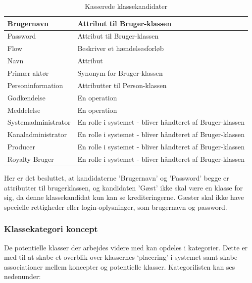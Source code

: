 \begin{table}[H]
\begin{tabularx}{\textwidth}{|X|X|}
        \hline
        Brugernavn & Attribut til Bruger-klassen\\
        \hline
        Password & Attribut til Bruger-klassen\\
        \hline
        Flow & Beskriver et hændelsesforløb\\
        \hline
        Navn & Attribut \\
        \hline
        Primær aktør &  Synonym for Bruger-klassen\\
        \hline
        Personinformation &  Attributter til Person-klassen\\
        \hline
        Godkendelse & En operation \\
        \hline
        Meddelelse & En operation \\
        \hline
        Systemadministrator & En rolle i systemet - bliver håndteret af Bruger-klassen \\
        \hline
        Kanaladministrator & En rolle i systemet - bliver håndteret af Bruger-klassen \\
        \hline 
        Producer & En rolle i systemet - bliver håndteret af Bruger-klassen \\
        \hline
        Royalty Bruger & En rolle i systemet - bliver håndteret af Bruger-klassen \\
        \hline
    \end{tabularx}
    \caption{Kasserede klassekandidater}
    \label{table:deleted_class_candidates}
\end{table}

\noindent
Her er det besluttet, at kandidaterne 'Brugernavn' og 'Password' begge er attributter til brugerklassen, og kandidaten 'Gæst' ikke skal være en klasse for sig, da denne klassekandidat kun kan se krediteringerne. Gæster skal ikke have specielle rettigheder eller login-oplysninger, som brugernavn og password.


\subsubsection{Klassekategori koncept}
De potentielle klasser der arbejdes videre med kan opdeles i kategorier. Dette er med til at skabe et overblik over klassernes ‘placering’ i systemet samt skabe associationer mellem koncepter og potentielle klasser.
Kategorilisten kan ses nedenunder:

